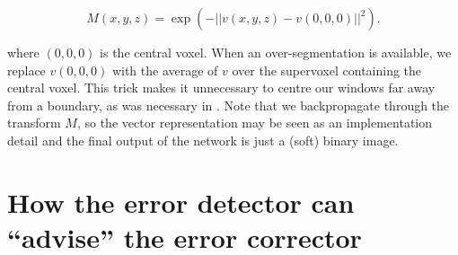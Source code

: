 \documentclass{article}
\begin{document}
\begin{equation*}
	M(x,y,z)=\exp\left( -||v(x,y,z)-v(0,0,0)||^2 \right).
\end{equation*}

where $(0,0,0)$ is the central voxel. When an over-segmentation is available, we replace $v(0,0,0)$ with the average of $v$ over the supervoxel containing the central voxel. This trick makes it unnecessary to centre our windows far away from a boundary, as was necessary in \cite{floodfilling}. Note that we backpropagate through the transform $M$, so the vector representation may be seen as an implementation detail and the final output of the network is just a (soft) binary image.

\section{How the error detector can ``advise'' the error corrector}
\end{document}
